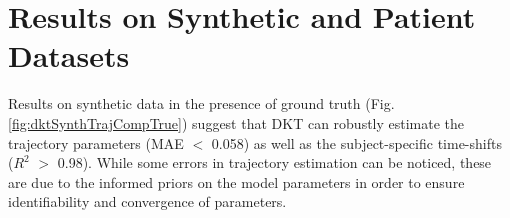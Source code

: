 \documentclass{llncs}
\begin{document}


\section{Results on Synthetic and Patient Datasets}
\label{sec:dktRes}

Results on synthetic data in the presence of ground truth (Fig. \ref{fig:dktSynthTrajCompTrue}) suggest that DKT can robustly estimate the trajectory parameters (MAE $<$ 0.058) as well as the subject-specific time-shifts ($R^2$ $>$ 0.98). While some errors in trajectory estimation can be noticed, these are due to the informed priors on the model parameters in order to ensure identifiability and convergence of parameters.
\end{document}

